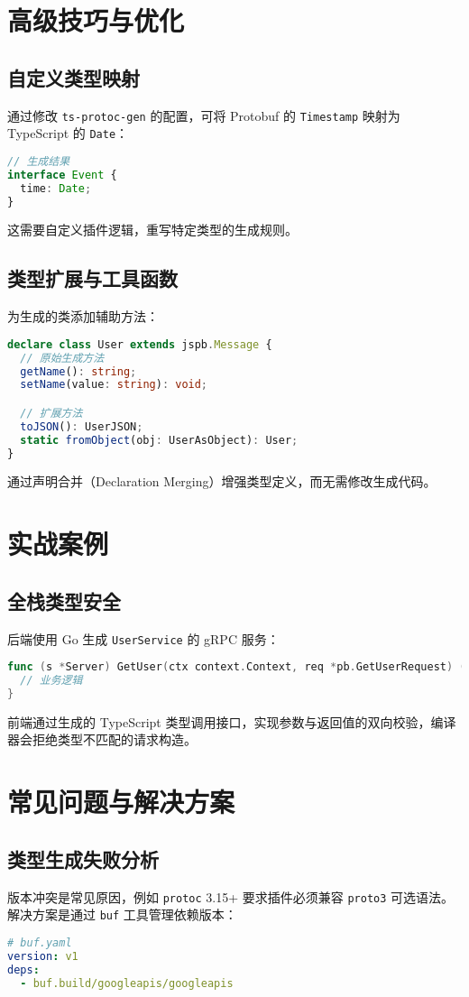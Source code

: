 \chapter{高级技巧与优化}
\section{自定义类型映射}
通过修改 \verb!ts-protoc-gen! 的配置，可将 Protobuf 的 \verb!Timestamp! 映射为 TypeScript 的 \verb!Date!：\par
\begin{lstlisting}[language=typescript]
// 生成结果
interface Event {
  time: Date;
}
\end{lstlisting}
这需要自定义插件逻辑，重写特定类型的生成规则。\par
\section{类型扩展与工具函数}
为生成的类添加辅助方法：\par
\begin{lstlisting}[language=typescript]
declare class User extends jspb.Message {
  // 原始生成方法
  getName(): string;
  setName(value: string): void;

  // 扩展方法
  toJSON(): UserJSON;
  static fromObject(obj: UserAsObject): User;
}
\end{lstlisting}
通过声明合并（Declaration Merging）增强类型定义，而无需修改生成代码。\par
\chapter{实战案例}
\section{全栈类型安全}
后端使用 Go 生成 \verb!UserService! 的 gRPC 服务：\par
\begin{lstlisting}[language=go]
func (s *Server) GetUser(ctx context.Context, req *pb.GetUserRequest) (*pb.User, error) {
  // 业务逻辑
}
\end{lstlisting}
前端通过生成的 TypeScript 类型调用接口，实现参数与返回值的双向校验，编译器会拒绝类型不匹配的请求构造。\par
\chapter{常见问题与解决方案}
\section{类型生成失败分析}
版本冲突是常见原因，例如 \verb!protoc! 3.15+ 要求插件必须兼容 \verb!proto3! 可选语法。解决方案是通过 \verb!buf! 工具管理依赖版本：\par
\begin{lstlisting}[language=yaml]
# buf.yaml
version: v1
deps:
  - buf.build/googleapis/googleapis
\end{lstlisting}
